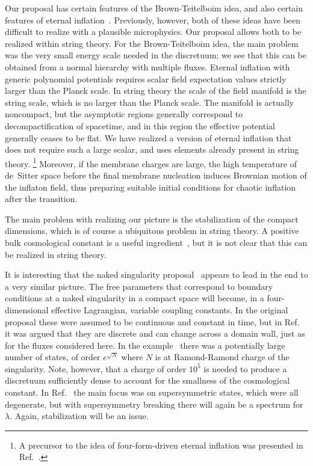\documentclass[12pt]{article}
\begin{document}
Our proposal has certain features of the Brown-Teitelboim idea, and
also certain features of eternal inflation~\cite{Lin86a}.  Previously,
however, both of these ideas have been difficult to realize with a
plausible microphysics.  Our proposal allows both to be realized
within string theory.  For the Brown-Teitelboim idea, the main problem
was the very small energy scale needed in the discretuum; we see that
this can be obtained from a normal hierarchy with multiple fluxes.
Eternal inflation with generic polynomial potentials requires scalar
field expectation values strictly larger than the Planck scale.  In
string theory the scale of the field manifold is the string scale,
which is no larger than the Planck scale.  The manifold is actually
noncompact, but the asymptotic regions generally correspond to
decompactification of spacetime, and in this region the effective
potential generally ceases to be flat.  We have realized a version of
eternal inflation that does not require such a large scalar, and uses
elements already present in string theory.%
%
\footnote{A precursor to the idea of four-form-driven eternal
inflation was presented in Ref.~\cite{BouCha98}.}
%
Moreover, if the membrane charges are large, the high temperature of
de~Sitter space before the final membrane nucleation induces Brownian
motion of the inflaton field, thus preparing suitable initial
conditions for chaotic inflation after the transition.

The main problem with realizing our picture is the stabilization of
the compact dimensions, which is of course a ubiquitous problem in
string theory.  A positive bulk cosmological constant is a useful
ingredient~\cite{Sun98,ArkDim98b}, but it is not clear that this can
be realized in string theory.

It is interesting that the naked singularity
proposal~\cite{Ark00,Kac00} appears to lead in the end to a very
similar picture.  The free parameters that correspond to boundary
conditions at a naked singularity in a compact space will become, in a
four-dimensional effective Lagrangian, variable coupling constants.
In the original proposal these were assumed to be continuous and
constant in time, but in Ref.~\cite{PolStr00} it was argued that they
are discrete and can change across a domain wall, just as for the
fluxes considered here.  In the example~\cite{PolStr00} there was a
potentially large number of states, of order $e^{\sqrt N}$ where $N$
is at Ramond-Ramond charge of the singularity.  Note, however, that a
charge of order $10^5$ is needed to produce a discretuum sufficiently
dense to account for the smallness of the cosmological constant.  In
Ref.~\cite{PolStr00} the main focus was on supersymmetric states,
which were all degenerate, but with supersymmetry breaking there will
again be a spectrum for $\lambda$.  Again, stabilization will be an
issue.
\end{document}
